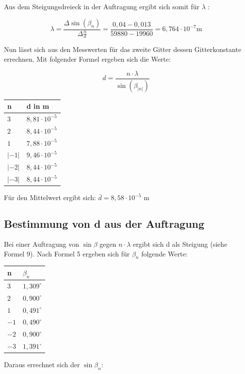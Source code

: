 \documentclass[12pt,a4paper,titlepage,headinclude,bibtotoc]{scrartcl}
\begin{document}
Aus dem Steigungsdreieck in der Auftragung ergibt sich somit für $\lambda$ :

\begin{equation}
\lambda =  \frac{\Delta \sin(\beta_n)}{\Delta\frac{n}{d}} = \frac{0,04 - 0,013}{59880 - 19960} = 6,764 \cdot 10^{-7} \mathrm{m}
\end{equation}

Nun lässt sich aus den Messwerten für das zweite Gitter dessen Gitterkonstante errechnen. Mit folgender Formel ergeben sich die Werte:

\begin{equation}
d = \dfrac{n\cdot \lambda}{\sin(\beta_{|n|})} 
\end{equation}

\begin{table} [h]
\centering
\begin{tabular}{|p{4 cm}||p{4 cm}|}
        \hline
		n & d in m \\
         \hline 
         $3$ & $8,81\cdot 10^{-5}$  \\
         \hline
         $2$ & $8,44 \cdot 10 ^{-5}$ \\
         \hline
         $1$ & $7,88\cdot 10^{-5}$\\
         \hline
         $|-1|$ & $9,46 \cdot 10^{-5} $   \\
         \hline
         $|-2|$ & $8,44\cdot 10^{-5}  $  \\
         \hline             
         $|-3|$ & $8,44\cdot 10^{-5}$   \\
         \hline
\end{tabular}
\end{table}

Für den Mittelwert ergibt sich:
$\bar{d} = 8,58\cdot 10^{-5}$ m

\subsection{Bestimmung von d aus der Auftragung}

Bei einer Auftragung von $\sin\beta $ gegen $n \cdot \lambda $ ergibt sich d als Steigung (siehe Formel 9). 
Nach Formel 5 ergeben sich für $\beta_n$ folgende Werte:

\begin{table} [h]
\centering
\begin{tabular}{|p{4 cm}||p{4 cm}|}
        \hline
		n & $\beta_n$ \\
         \hline 
         $3$ & $1,309^\circ$  \\
         \hline
         $2$ & $0,900^\circ$ \\
         \hline
         $1$ & $0,491^\circ$\\
         \hline
         $-1$ & $0,490^\circ$   \\
         \hline
         $-2$ & $0,900^\circ$  \\
         \hline             
         $-3$ & $1,391^\circ$   \\
         \hline
\end{tabular}
\end{table}
\vspace{6cm}
Daraus errechnet sich der $\sin\beta_n$:
\end{document}
